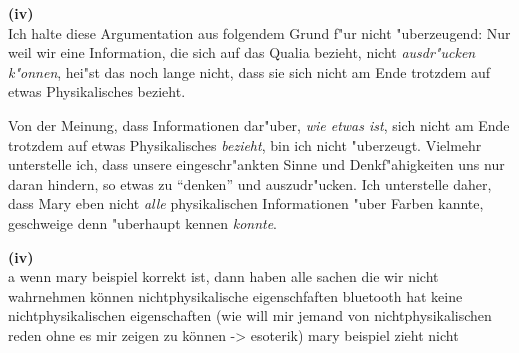 \documentclass[a4paper]{article}
\begin{document}
\begin{prooftree}
\end{prooftree}


\noindent\textbf{(iv)}\\
\noindent Ich halte diese Argumentation aus folgendem Grund f"ur nicht "uberzeugend: Nur weil wir eine Information, die sich auf das Qualia bezieht, nicht \emph{ausdr"ucken k"onnen}, hei"st das noch lange nicht, dass sie sich nicht am Ende trotzdem auf etwas Physikalisches bezieht. 

Von der Meinung, dass Informationen dar"uber, \emph{wie etwas ist}, sich nicht am Ende trotzdem auf etwas Physikalisches \emph{bezieht}, bin ich nicht "uberzeugt. Vielmehr unterstelle ich, dass unsere eingeschr"ankten Sinne und Denkf"ahigkeiten uns nur daran hindern, so etwas zu "`denken"' und auszudr"ucken. Ich unterstelle daher, dass Mary eben nicht \emph{alle} physikalischen Informationen "uber Farben kannte, geschweige denn "uberhaupt kennen \emph{konnte}.

\noindent\textbf{(iv)}\\
\noindent a wenn mary beispiel korrekt ist, dann haben alle sachen die wir nicht wahrnehmen können nichtphysikalische eigenschfaften
bluetooth hat keine nichtphysikalischen eigenschaften (wie will mir jemand von nichtphysikalischen reden ohne es mir zeigen zu können -> esoterik)
mary beispiel zieht nicht
\end{document}

